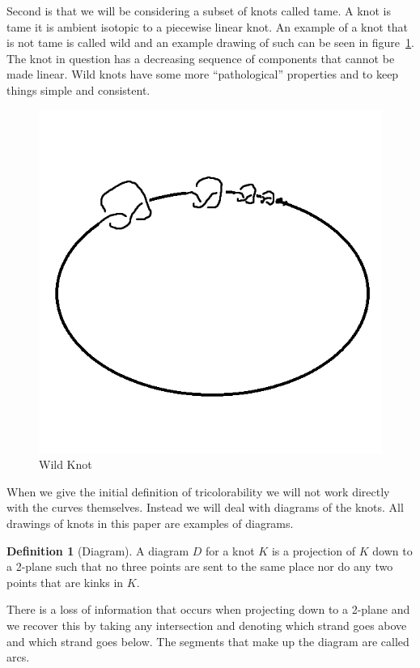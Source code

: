 \documentclass[12pt]{amsart}
\theoremstyle{definition}
\newtheorem{definition}[theorem]{Definition}
\theoremstyle{remark}
\numberwithin{equation}{section}
\newcommand{\ds}{.3}
\begin{document}
Second is that we will be considering a subset of knots called tame. A knot
is tame it is ambient isotopic to a piecewise linear knot. An example of
a knot that is not tame is called wild and an example drawing of such can be
seen in figure~\ref{fig:wild}. The knot in question has a decreasing sequence of
components that cannot be made linear. Wild knots have some more ``pathological''
properties and to keep things simple and consistent.

\begin{figure}
  \includegraphics[scale=\ds]{wild}
  \caption{Wild Knot}
  \label{fig:wild}
\end{figure}

When we give the initial definition of  tricolorability we will not work
directly with the curves themselves. Instead we will deal with diagrams
of the knots. All drawings of knots in this paper are examples of diagrams.

\begin{definition}[Diagram]
  A diagram $D$ for a knot $K$ is a projection of $K$ down to a 2-plane
  such that no three points are sent to the same place nor do any two
  points that are kinks in $K$.
\end{definition}

There is a loss of information that occurs when projecting down to a 2-plane
and we recover this by taking any intersection and denoting which strand
goes above and which strand goes below. The segments that make up the
diagram are called arcs.
\end{document}
